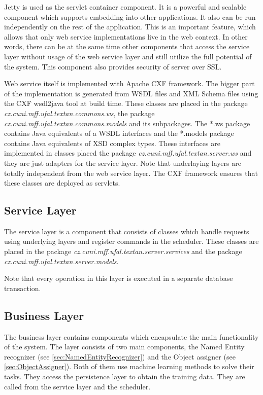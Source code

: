 Jetty is used as the servlet container component. It is a powerful and scalable
component which supports embedding into other applications.
It also can be run independently on the rest of the application. This is an
important feature, which allows that only web service implementations live in the
web context. In other words, there can be at the same time other components that
access the service layer without usage of the web service layer and still utilize
the full potential of the system. This component also provides security of \textan
server over SSL.

Web service itself is implemented with Apache CXF framework. The bigger part of
the implementation is generated from WSDL files and XML Schema files using the
CXF wsdl2java tool at build time. These classes are placed in the package
\emph{cz.\-cuni.\-mff.\-ufal.\-textan.\-commons.\-ws}, the package
\emph{cz.\-cuni.\-mff.\-ufal.\-textan.\-commons.\-models} and its subpackages.
The *.ws package contains Java equivalents of a WSDL interfaces and the *.models
package contains Java equivalents of XSD complex types. These interfaces are
implemented in classes placed the package \emph{cz.\-cuni.\-mff.\-ufal.\-textan.\-server.\-ws}
and they are just adapters for the service layer. Note that underlaying layers
are totally independent from the web service layer. The CXF framework ensures
that these classes are deployed as servlets.

\subsection{Service Layer}
The service layer is a component that consists of classes which handle requests
using underlying layers and register commands in the scheduler. These classes
are placed in the package \emph{cz.\-cuni.\-mff.\-ufal.\-textan.\-server.\-services}
and the package \emph{cz.\-cuni.\-mff.\-ufal.\-textan.\-server.\-models}.

Note that every operation in this layer is executed in a separate database transaction.

\subsection{Business Layer}
The business layer contains components which encapsulate the main functionality
of the system. The layer consists of two main components, the Named Entity
recognizer (see \autoref{sec:NamedEntityRecognizer}) and the Object assigner 
(see \autoref{sec:ObjectAssigner}). Both of them use machine learning methods to
solve their tasks. They access the persistence layer to obtain the training
data. They are called from the service layer and the scheduler.

